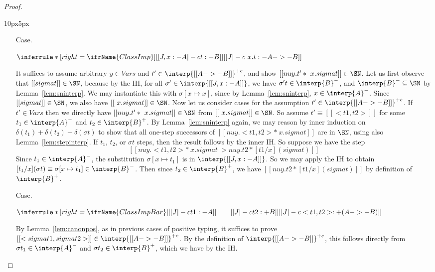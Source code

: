 \begin{proof}
\begin{changemargin}{10px}{5px}
\begin{itemize}
\item[Case.]\ 

\vspace{-.2cm}
\begin{center}
\begin{math}
\inferrule* [right=\ifrName{ClassImp}] {[[J , x : - A |-c t : - B]]}{[[J |-c \ x . t : - A ->- B]]}
\end{math}
\end{center}
It suffices to assume arbitrary $y\in\textit{Vars}$ and
$t'\in\interp{[[A ->- B]]}^{+c}$, and show $[[ nu y . t' * \ x . sigma
t]]\in\SN$.  Let us first observe that $[[sigma t]]\in\SN$, because by
the IH, for all $\sigma'\in\interp{[[J , x : - A]]}$, we have $\sigma'
t\in\interp{B}^-$, and $\interp{B}^-\subseteq\SN$ by
Lemma~\ref{lem:sninterp}.  We may instantiate this with
$\sigma[x\mapsto x]$, since by Lemma~\ref{lem:sninterp},
$x\in\interp{A}^-$.  Since $[[sigma t]]\in\SN$, we also have $[[\ x
. sigma t]]\in\SN$.  Now let us consider cases for the assumption
$t'\in\interp{[[A ->- B]]}^{+c}$.  If $t'\in\textit{Vars}$ then we
directly have $[[ nu y . t' * \ x . sigma t]]\in\SN$ from $[[\ x
. sigma t]]\in\SN$.  So assume $t'\equiv[[< t1 , t2>]]$ for some
$t_1\in\interp{A}^-$ and $t_2\in\interp{B}^+$.  By
Lemma~\ref{lem:sninterp} again, we may reason by inner induction on
$\delta(t_1)+\delta(t_2)+\delta(\sigma t)$ to show that all one-step
successors of $[[ nu y . < t1 , t2 > * \ x . sigma t]]$ are in $\SN$,
using also Lemma~\ref{lem:stepinterp}.  If $t_1$, $t_2$, or $\sigma t$
steps, then the result follows by the inner IH.  So suppose we have
the step
\[
[[ nu y . < t1 , t2 > * \ x . sigma t ~>  nu y . t2 * [t1 / x ] (sigma t) ]]
\]
Since $t_1\in\interp{A}^-$, the substitution $\sigma[x\mapsto t_1]$ is
in $\interp{[[J , x : - A]]}$.  So we may apply the IH to obtain $[t_1
/ x ] (\sigma t) \equiv \sigma[x\mapsto t_1]\in\interp{B}^-$.  Then
since $t_2\in\interp{B}^+$, we have $[[nu y . t2 * [t1 / x ] (sigma t)
]]$ by definition of $\interp{B}^+$.

\item[Case.]\ 

\vspace{-.2cm}
\begin{center}
\begin{math}
\inferrule* [right=\ifrName{ClassImpBar}] {[[J |-c t1 : - A]]  \qquad [[ J |-c t2 : + B ]]}{[[ J |-c < t1 , t2 > : + (A ->- B) ]]}
\end{math}
\end{center}
By Lemma~\ref{lem:canonpos}, as in previous cases of positive typing,
it suffices to prove $[[< sigma t1 , sigma t2>]]\in\interp{[[A ->-
  B]]}^{+c}$.  By the definition of $\interp{[[A ->- B]]}^{+c}$, this
follows directly from $\sigma t_1\in\interp{A}^-$ and $\sigma
t_2\in\interp{B}^+$, which we have by the IH.


\end{itemize}
\end{changemargin}
\end{proof}
